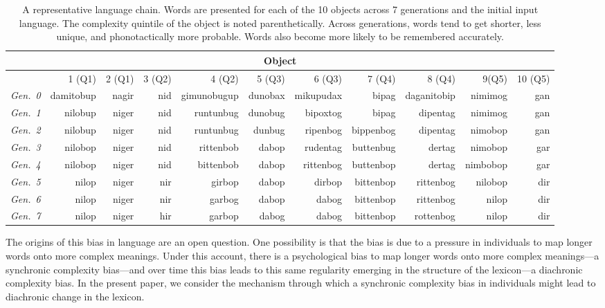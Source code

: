 


\begin{table}[t]
 \scriptsize
\centering
\begin{tabular}{c rrrrrrrrrr}
\hline
 \multicolumn{11}{c}{Object} \\
 \hline

 \rule{0pt}{2ex}    
& 1 (Q1) & 2 (Q1) & 3 (Q2) & 4 (Q2) & 5 (Q3) & 6 (Q3) & 7 (Q4) & 8 (Q4) & 9(Q5) & 10 (Q5) \\ 
 \hline
    {\it Gen.\ 0} & damitobup & nagir & nid & gimunobugup & dunobax & mikupudax & bipag & daganitobip & nimimog & gan \\ 
   {\it Gen.\ 1}& nilobup & niger & nid & runtunbug & dunobug & bipoxtog & bipag & dipentag & nimimog & gan \\ 
    {\it Gen.\ 2} & nilobup & niger & nid & runtunbug & dunbug & ripenbog & bippenbog & dipentag & nimobop & gan \\ 
  {\it Gen.\ 3} & nilobop & niger & nid & rittenbob & dabop & rudentag & buttenbug & dertag & nimobop & gar \\ 
   {\it Gen.\ 4} & nilobop & niger & nid & bittenbob & dabop & rittenbog & buttenbop & dertag & nimbobop & gar \\ 
    {\it Gen.\ 5}  & nilop & niger & nir & girbop & dabop & dirbop & bittenbop & rittenbog & nilobop & dir \\ 
   {\it Gen.\ 6}& nilop & niger & nir & garbog & dabop & dabog & bittenbop & rittenbog & nilop & dir \\
   {\it Gen.\ 7}& nilop & niger & hir & garbop & dabog & dabog & bittenbop & rottenbog & nilop & dir \\ 
\hline
\end{tabular}
\caption{A representative language chain. Words are presented for each of the 10 objects across 7 generations and the initial input language. The complexity quintile of the object is noted parenthetically. Across generations, words tend to get shorter, less unique, and phonotactically more probable. Words also become more likely to be remembered accurately.}
\label{tab:ex}
\end{table}
\normalsize




The origins of this bias  in language are an open question. One possibility is that the bias is due to a pressure in individuals to map longer words onto more complex meanings. Under this account, there is a psychological bias to map longer words onto more complex meanings---a synchronic complexity bias---and over time this bias leads to this same regularity emerging in the structure of the lexicon---a diachronic complexity bias. In the present paper, we consider the mechanism through which a synchronic complexity bias in individuals might lead to diachronic change in the lexicon.  


